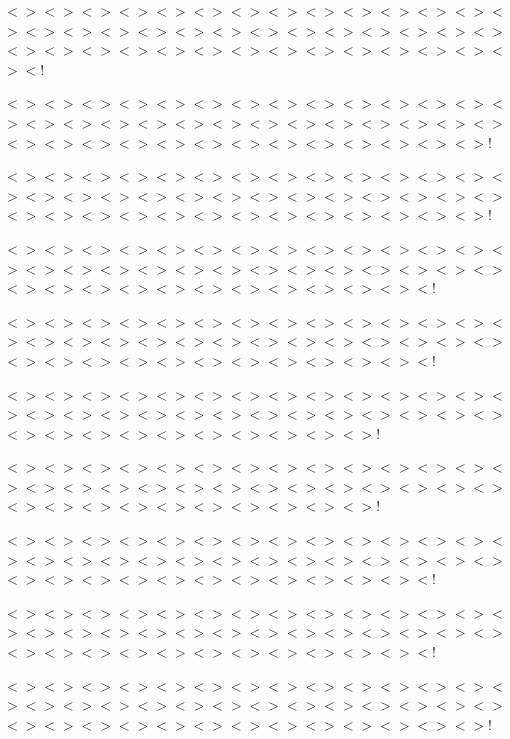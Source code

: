 $<$$>$$<$$>$$<$$>$$<$$>$$<$$>$$<$$>$$<$$>$$<$$>$$<$$>$$<$$>$$<$$>$$<$$>$$<$$>$$<$$>$$<$$>$$<$$>$$<$$>$$<$$>$$<$$>$$<$$>$$<$$>$$<$$>$$<$$>$$<$$>$$<$$>$$<$$>$$<$$>$$<$$>$$<$$>$$<$$>$$<$$>$$<$$>$$<$$>$$<$$>$$<$$>$$<$$>$$<$$>$$<$$>$$<$$>$$<$$>$$<$$>$$<$!

$<$$>$$<$$>$$<$$>$$<$$>$$<$$>$$<$$>$$<$$>$$<$$>$$<$$>$$<$$>$$<$$>$$<$$>$$<$$>$$<$$>$$<$$>$$<$$>$$<$$>$$<$$>$$<$$>$$<$$>$$<$$>$$<$$>$$<$$>$$<$$>$$<$$>$$<$$>$$<$$>$$<$$>$$<$$>$$<$$>$$<$$>$$<$$>$$<$$>$$<$$>$$<$$>$$<$$>$$<$$>$$<$$>$$<$$>$$<$$>$!

$<$$>$$<$$>$$<$$>$$<$$>$$<$$>$$<$$>$$<$$>$$<$$>$$<$$>$$<$$>$$<$$>$$<$$>$$<$$>$$<$$>$$<$$>$$<$$>$$<$$>$$<$$>$$<$$>$$<$$>$$<$$>$$<$$>$$<$$>$$<$$>$$<$$>$$<$$>$$<$$>$$<$$>$$<$$>$$<$$>$$<$$>$$<$$>$$<$$>$$<$$>$$<$$>$$<$$>$$<$$>$$<$$>$$<$$>$$<$$>$!

$<$$>$$<$$>$$<$$>$$<$$>$$<$$>$$<$$>$$<$$>$$<$$>$$<$$>$$<$$>$$<$$>$$<$$>$$<$$>$$<$$>$$<$$>$$<$$>$$<$$>$$<$$>$$<$$>$$<$$>$$<$$>$$<$$>$$<$$>$$<$$>$$<$$>$$<$$>$$<$$>$$<$$>$$<$$>$$<$$>$$<$$>$$<$$>$$<$$>$$<$$>$$<$$>$$<$$>$$<$$>$$<$$>$$<$!

$<$$>$$<$$>$$<$$>$$<$$>$$<$$>$$<$$>$$<$$>$$<$$>$$<$$>$$<$$>$$<$$>$$<$$>$$<$$>$$<$$>$$<$$>$$<$$>$$<$$>$$<$$>$$<$$>$$<$$>$$<$$>$$<$$>$$<$$>$$<$$>$$<$$>$$<$$>$$<$$>$$<$$>$$<$$>$$<$$>$$<$$>$$<$$>$$<$$>$$<$$>$$<$$>$$<$$>$$<$$>$$<$$>$$<$!

$<$$>$$<$$>$$<$$>$$<$$>$$<$$>$$<$$>$$<$$>$$<$$>$$<$$>$$<$$>$$<$$>$$<$$>$$<$$>$$<$$>$$<$$>$$<$$>$$<$$>$$<$$>$$<$$>$$<$$>$$<$$>$$<$$>$$<$$>$$<$$>$$<$$>$$<$$>$$<$$>$$<$$>$$<$$>$$<$$>$$<$$>$$<$$>$$<$$>$$<$$>$$<$$>$$<$$>$$<$$>$!

$<$$>$$<$$>$$<$$>$$<$$>$$<$$>$$<$$>$$<$$>$$<$$>$$<$$>$$<$$>$$<$$>$$<$$>$$<$$>$$<$$>$$<$$>$$<$$>$$<$$>$$<$$>$$<$$>$$<$$>$$<$$>$$<$$>$$<$$>$$<$$>$$<$$>$$<$$>$$<$$>$$<$$>$$<$$>$$<$$>$$<$$>$$<$$>$$<$$>$$<$$>$$<$$>$$<$$>$$<$$>$!

$<$$>$$<$$>$$<$$>$$<$$>$$<$$>$$<$$>$$<$$>$$<$$>$$<$$>$$<$$>$$<$$>$$<$$>$$<$$>$$<$$>$$<$$>$$<$$>$$<$$>$$<$$>$$<$$>$$<$$>$$<$$>$$<$$>$$<$$>$$<$$>$$<$$>$$<$$>$$<$$>$$<$$>$$<$$>$$<$$>$$<$$>$$<$$>$$<$$>$$<$$>$$<$$>$$<$$>$$<$$>$$<$$>$$<$!

$<$$>$$<$$>$$<$$>$$<$$>$$<$$>$$<$$>$$<$$>$$<$$>$$<$$>$$<$$>$$<$$>$$<$$>$$<$$>$$<$$>$$<$$>$$<$$>$$<$$>$$<$$>$$<$$>$$<$$>$$<$$>$$<$$>$$<$$>$$<$$>$$<$$>$$<$$>$$<$$>$$<$$>$$<$$>$$<$$>$$<$$>$$<$$>$$<$$>$$<$$>$$<$$>$$<$$>$$<$$>$$<$$>$$<$!

$<$$>$$<$$>$$<$$>$$<$$>$$<$$>$$<$$>$$<$$>$$<$$>$$<$$>$$<$$>$$<$$>$$<$$>$$<$$>$$<$$>$$<$$>$$<$$>$$<$$>$$<$$>$$<$$>$$<$$>$$<$$>$$<$$>$$<$$>$$<$$>$$<$$>$$<$$>$$<$$>$$<$$>$$<$$>$$<$$>$$<$$>$$<$$>$$<$$>$$<$$>$$<$$>$$<$$>$$<$$>$$<$$>$$<$$>$$<$$>$!

